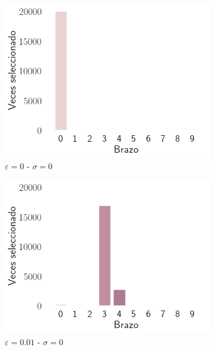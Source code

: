 \documentclass[12pt]{article}
\begin{document}
    \begin{figure}[h]
        \centering
        \begin{subfigure}[H]{0.3\textwidth}
            \includegraphics[width=\textwidth]{../img/arm_sigma_0_epsilon_0}
            \caption{$\varepsilon=0$ - $\sigma=0$}
            \label{fig:arms_selected_0_0}
        \end{subfigure}
        \begin{subfigure}[H]{0.3\textwidth}
            \includegraphics[width=\textwidth]{../img/arm_sigma_0_epsilon_0.01}
            \caption{$\varepsilon=0.01$ - $\sigma=0$}
            \label{fig:arms_selected_0_0.01}
        \end{subfigure}
        \begin{subfigure}[H]{0.3\textwidth}

\end{subfigure}
\end{figure}
\end{document}

